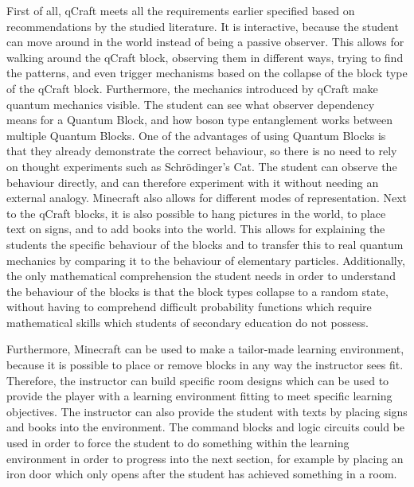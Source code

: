 \documentclass[11pt,twoside]{report} %
\begin{document}
First of all, qCraft meets all the requirements earlier specified based on recommendations by the studied literature. It is interactive, because the student can move around in the world instead of being a passive observer. This allows for walking around the qCraft block, observing them in different ways, trying to find the patterns, and even trigger mechanisms based on the collapse of the block type of the qCraft block. Furthermore, the mechanics introduced by qCraft make quantum mechanics visible. The student can see what observer dependency means for a Quantum Block, and how boson type entanglement works between multiple Quantum Blocks. One of the advantages of using Quantum Blocks is that they already demonstrate the correct behaviour, so there is no need to rely on thought experiments such as Schrödinger's Cat. The student can observe the behaviour directly, and can therefore experiment with it without needing an external analogy. Minecraft also allows for different modes of representation. Next to the qCraft blocks, it is also possible to hang pictures in the world, to place text on signs, and to add books into the world. This allows for explaining the students the specific behaviour of the blocks and to transfer this to real quantum mechanics by comparing it to the behaviour of elementary particles. Additionally, the only mathematical comprehension the student needs in order to understand the behaviour of the blocks is that the block types collapse to a random state, without having to comprehend difficult probability functions which require mathematical skills which students of secondary education do not possess.

Furthermore, Minecraft can be used to make a tailor-made learning environment, because it is possible to place or remove blocks in any way the instructor sees fit. Therefore, the instructor can build specific room designs which can be used to provide the player with a learning environment fitting to meet specific learning objectives. The instructor can also provide the student with texts by placing signs and books into the environment. The command blocks and logic circuits could be used in order to force the student to do something within the learning environment in order to progress into the next section, for example by placing an iron door which only opens after the student has achieved something in a room.
\end{document}
